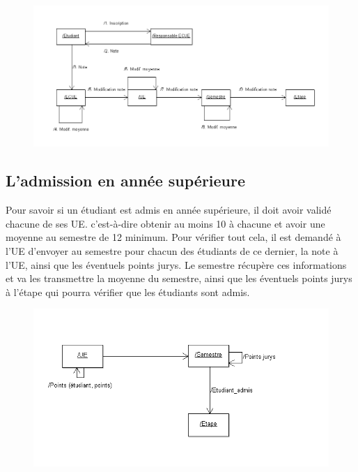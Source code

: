 \documentclass[letter, 11pt] {article}
\begin{document}
		\begin{figure}[htbp]
			\centering
				\includegraphics[scale = 0.6]{../Diagrammes_collaboration/Rattrapages.png}
		\end{figure}
		
		\newpage
		
		
		
		\subsection{L'admission en année supérieure}
		
		Pour savoir si un étudiant est admis en année supérieure, il doit avoir validé chacune de ses UE. c'est-à-dire obtenir au moins 10 à chacune et avoir une moyenne au semestre de 12 minimum. Pour vérifier tout cela, il est demandé à l’UE d’envoyer au semestre pour chacun des étudiants de ce dernier, la note à l’UE, ainsi que les éventuels points jurys. Le semestre récupère ces informations et va les transmettre la moyenne du semestre, ainsi que les éventuels points jurys à l’étape qui pourra vérifier que les étudiants sont admis.
		
		\begin{figure}[!h]
			\centering
				\includegraphics[scale = 0.7]{../Diagrammes_collaboration/Admission_en_sup.png}
		\end{figure}
		
\end{document}
